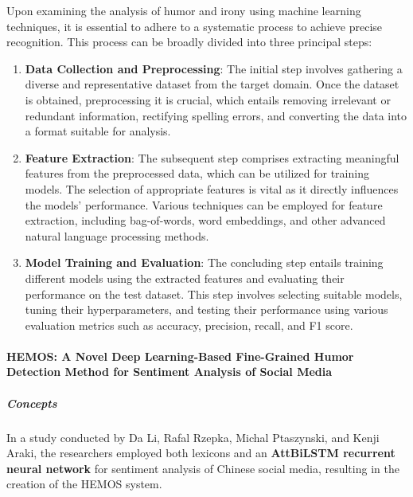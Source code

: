 \documentclass[a4paper]{article}
\begin{document}
Upon examining the analysis of humor and irony using machine learning techniques, it is essential to adhere to a systematic process to achieve precise recognition. This process can be broadly divided into three principal steps:
\begin{enumerate}
    \item \textbf{Data Collection and Preprocessing}: The initial step involves gathering a diverse and representative dataset from the target domain. Once the dataset is obtained, preprocessing it is crucial, which entails removing irrelevant or redundant information, rectifying spelling errors, and converting the data into a format suitable for analysis.
    \item \textbf{Feature Extraction}: The subsequent step comprises extracting meaningful features from the preprocessed data, which can be utilized for training models. The selection of appropriate features is vital as it directly influences the models' performance. Various techniques can be employed for feature extraction, including bag-of-words, word embeddings, and other advanced natural language processing methods.
    \item \textbf{Model Training and Evaluation}: The concluding step entails training different models using the extracted features and evaluating their performance on the test dataset. This step involves selecting suitable models, tuning their hyperparameters, and testing their performance using various evaluation metrics such as accuracy, precision, recall, and F1 score.
\end{enumerate} 

\paragraph{HEMOS: A Novel Deep Learning-Based Fine-Grained Humor Detection Method for Sentiment Analysis of Social Media}\cite{ref_rnn2}

\subparagraph{Concepts}In a study conducted by Da Li, Rafal Rzepka, Michal Ptaszynski, and Kenji Araki, the researchers employed both lexicons and an \textbf{AttBiLSTM recurrent neural network} for sentiment analysis of Chinese social media, resulting in the creation of the HEMOS system.
\end{document}
